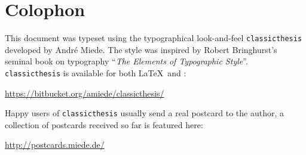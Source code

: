 
\pagestyle{empty}

\hfill

\vfill


\section*{Colophon}

This document was typeset using the typographical look-and-feel \texttt{classicthesis} developed by Andr\'e Miede. The style was inspired by Robert Bringhurst's seminal book on typography ``\emph{The Elements of Typographic Style}''. \texttt{classicthesis} is available for both \LaTeX\ and \mLyX: 

\begin{center}
\url{https://bitbucket.org/amiede/classicthesis/}
\end{center}

\noindent Happy users of \texttt{classicthesis} usually send a real postcard to the author, a collection of postcards received so far is featured here: 

\begin{center}
\url{http://postcards.miede.de/}
\end{center}
 
\bigskip

\noindent\finalVersionString